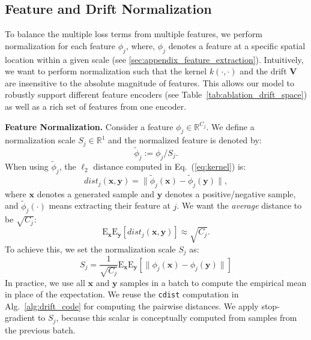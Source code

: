 \documentclass{article}
\newcommand{\vv}[1]{\mathbf{#1}}
\newcommand{\x}{\vv{x}}
\newcommand{\y}{\vv{y}}
\newcommand{\V}{\vv{V}}
\renewcommand{\paragraph}[1]{\vspace{.05em}\noindent\textbf{#1}}
\theoremstyle{plain}
\theoremstyle{definition}
\theoremstyle{remark}
\begin{document}
\subsection{Feature and Drift Normalization}
\label{sec:appendix_feature_and_loss_normalization}

To balance the multiple loss terms from multiple features, we perform normalization for each feature $\phi_j$, where, $\phi_j$ denotes a feature at a specific spatial location within a given scale (see \ref{sec:appendix_feature_extraction}).
Intuitively, we want to perform normalization such that the kernel $k(\cdot, \cdot)$ and the drift $\V$ are insensitive to the absolute magnitude of features.
This allows our model to robustly support different feature encoders (see Table~\ref{tab:ablation_drift_space}) as well as a rich set of features from one encoder.

\paragraph{Feature Normalization.} Consider a feature $\phi_j \in \mathbb{R}^{C_j}$. We define a normalization scale $S_j \in \mathbb{R}^{1}$ and the normalized feature is denoted by:
\begin{equation}
\tilde{\phi}_j := {\phi}_j / S_j.
\end{equation}
When using $\tilde{\phi}_j$, the $\ell_2$ distance computed in Eq.~(\ref{eq:kernel}) is:
\begin{equation}
dist_j(\x, \y) = \|\tilde{\phi}_j(\x) - \tilde{\phi}_j(\y)\|,
\end{equation}
where $\x$ denotes a generated sample and $\y$ denotes a positive/negative sample, and $\tilde{\phi}_j(\cdot)$ means extracting their feature at $j$. We want the \textit{average} distance to be $\sqrt{C_j}$:
\begin{equation}
\mathrm{E}_\x \mathrm{E}_\y [ dist_j(\x, \y)] \approx \sqrt{C_j}.
\end{equation}
To achieve this, we set the normalization scale $S_j$ as:
\begin{equation}
S_j = \frac{1}{\sqrt{C_j}} \mathrm{E}_\x \mathrm{E}_\y [ \|{\phi}_j(\x) - {\phi}_j(\y)\| ]
\end{equation}
In practice, we use all $\x$ and $\y$ samples in a batch to compute the empirical mean in place of the expectation. We reuse the \texttt{cdist} computation in Alg.~\ref{alg:drift_code} for computing the pairwise distances. We apply stop-gradient to $S_j$, because this scalar is conceptually computed from samples from the previous batch.
\end{document}
